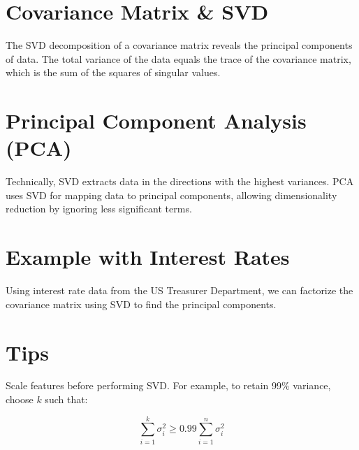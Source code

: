 \documentclass{ximera}
\begin{document}
\section{Covariance Matrix \& SVD}
The SVD decomposition of a covariance matrix reveals the principal components of data. The total variance of the data equals the trace of the covariance matrix, which is the sum of the squares of singular values.

\section{Principal Component Analysis (PCA)}
Technically, SVD extracts data in the directions with the highest variances. PCA uses SVD for mapping data to principal components, allowing dimensionality reduction by ignoring less significant terms.

\section{Example with Interest Rates}
Using interest rate data from the US Treasurer Department, we can factorize the covariance matrix using SVD to find the principal components.

\section{Tips}
Scale features before performing SVD. For example, to retain 99\% variance, choose \(k\) such that:

\[
\sum_{i=1}^k \sigma_i^2 \geq 0.99 \sum_{i=1}^n \sigma_i^2
\]
\end{document}
